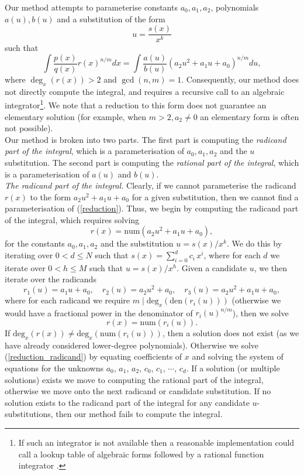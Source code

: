 \documentclass[12pt]{article}
\numberwithin{equation}{section}
\theoremstyle{definition}
\begin{document}
Our method attempts to parameterise constants $a_0, a_1, a_2$, polynomials $a(u), b(u)$ and a 
substitution of the form 
$$u = \frac{s(x)}{x^k}$$ 
such that
\begin{equation}
\int \frac{p(x)}{q(x)}r(x)^{n/m}dx = \int \frac{a(u)}{b(u)}\left(a_2u^2+a_1u+a_0\right)^{n/m}du,\label{reduction}
\end{equation}
where $\deg_x(r(x))>2$ and $\gcd (n,m)=1$. Consequently, our method does not directly compute the 
integral, and requires a recursive call to an algebraic integrator\footnote{If such an integrator is not 
available then a reasonable implementation could call a lookup table of algebraic forms \cite{Prudnikov1986} 
followed by a rational function integrator \cite{Bronstein1997}.}. We note that a reduction to this form
does not guarantee an elementary solution (for example, when $m>2,a_2\ne0$ an elementary form 
is often not possible). \\

Our method is broken into two parts. The first part is computing the \textit{radicand part of 
the integral}, which is a parameterisation of $a_0,a_1,a_2$ and the $u$ 
substitution. The second part is computing the \textit{rational part of the integral}, which is 
a parameterisation of $a(u)$ and $b(u)$.\\

\textit{The radicand part of the integral.} Clearly, if we cannot parameterise the radicand $r(x)$ 
to the form $a_2u^2+a_1u+a_0$ for a given substitution, then we cannot find a 
parameterisation of (\ref{reduction}). Thus, we begin by computing the radicand part 
of the integral, which requires solving 
$$r(x) = \text{num}\left( a_2u^2 + a_1u + a_0 \right),$$
for the constants $a_0,a_1,a_2$ and the substitution $u = s(x)/x^k$. We do this by iterating over 
$0 < d \leq N$ such that $s(x) = \sum\limits_{i=0}^{d} c_i\,x^{i}$, where for each $d$ we 
iterate over $0 < h \leq M$ such that $u = s(x)/x^h$. Given a candidate $u$, we then iterate over 
the radicands 
$$r_1(u) = a_1 u + a_0,\quad r_2(u) = a_2 u^2 + a_0, \quad r_3(u) = a_2 u^2 + a_1 u + a_0,$$ 
where for each radicand we require $m \mid \text{deg}_x\left(\text{den}\left(r_i(u)\right)\right)$ 
(otherwise we would have a fractional power in the denominator of $r_i(u)^{n/m}$), then we solve 
\begin{equation}
r(x) = \text{num}\left(r_i(u)\right).\label{reduction_radicand}
\end{equation}
If $\text{deg}_x\left(r(x)\right) \ne \text{deg}_x\left( \text{num}\left(r_i(u)\right) \right)$, then 
a solution does not exist (as we have already considered lower-degree polynomials).
Otherwise we solve (\ref{reduction_radicand}) by equating coefficients of $x$ and solving the system of 
equations for the unknowns $a_0$, $a_1$, $a_2$, $c_0$, $c_1$, $\cdots$, $c_d$. If a solution 
(or multiple solutions) exists we move to computing the rational part of the integral, otherwise 
we move onto the next radicand or candidate substitution. If no solution exists to the radicand 
part of the integral for any candidate $u$-substitutions, then our method fails to 
compute the integral.\\
\end{document}
